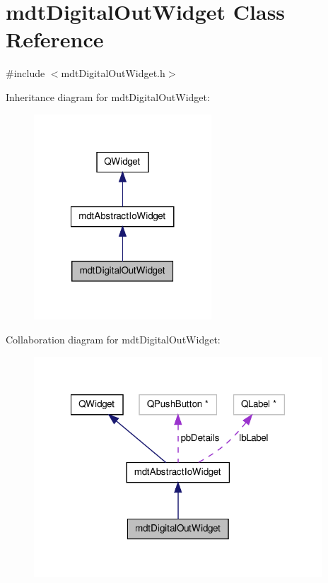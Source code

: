 \hypertarget{classmdt_digital_out_widget}{\section{mdt\-Digital\-Out\-Widget Class Reference}
\label{classmdt_digital_out_widget}
}


{\ttfamily \#include $<$mdt\-Digital\-Out\-Widget.\-h$>$}



Inheritance diagram for mdt\-Digital\-Out\-Widget\-:
\nopagebreak
\begin{figure}[H]
\begin{center}
\leavevmode
\includegraphics[width=188pt]{classmdt_digital_out_widget__inherit__graph}
\end{center}
\end{figure}


Collaboration diagram for mdt\-Digital\-Out\-Widget\-:
\nopagebreak
\begin{figure}[H]
\begin{center}
\leavevmode
\includegraphics[width=306pt]{classmdt_digital_out_widget__coll__graph}
\end{center}
\end{figure}
